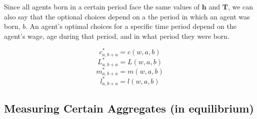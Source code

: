 \documentclass[letter, 12pt, epsf,leqno]{article}
\begin{document}
Since all agents born in a certain period face the same values of $\boldsymbol{h}$ and $\boldsymbol{T}$, we can also say that the optional choices depend on a the period in which an agent was born, $b$.  An agent's optimal choices for a specific time period depend on the agent's wage, age during that period, and in what period they were born.

\begin{equation}c_{a, b+a}^* = c(w, a, b)\end{equation}
\begin{equation}L_{a, b+a}^* = L(w, a, b)\end{equation}
\begin{equation}m_{a, b+a}^* = m(w, a, b)\end{equation}
\begin{equation}l_{a, b+a}^* = l(w, a, b)\end{equation}

\subsection{Measuring Certain Aggregates (in equilibrium)}
\end{document}
